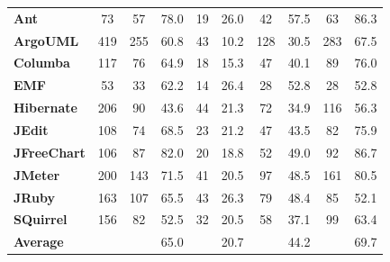 {\begin{table}[!thb]
\begin{center}
\begin{tabular}{l| c c c c c c c c c}
        \textbf{Ant}            & 73  & 57   & 78.0  & 19 & 26.0  & 42  & 57.5 & 63  & 86.3   \\
        \textbf{ArgoUML}        & 419 & 255  & 60.8  & 43 & 10.2  & 128 & 30.5 & 283 & 67.5   \\
        \textbf{Columba}        & 117 & 76   & 64.9  & 18 & 15.3  & 47  & 40.1 & 89  & 76.0   \\
        \textbf{EMF}            & 53  & 33   & 62.2  & 14 & 26.4  & 28  & 52.8 & 28  & 52.8   \\
        \textbf{Hibernate}      & 206 & 90   & 43.6  & 44 & 21.3  & 72  & 34.9 & 116 & 56.3   \\
        \textbf{JEdit}          & 108 & 74   & 68.5  & 23 & 21.2  & 47  & 43.5 & 82  & 75.9   \\
        \textbf{JFreeChart}     & 106 & 87   & 82.0  & 20 & 18.8  & 52  & 49.0 & 92  & 86.7   \\
        \textbf{JMeter}         & 200 & 143  & 71.5  & 41 & 20.5  & 97  & 48.5 & 161 & 80.5   \\
        \textbf{JRuby}          & 163 & 107  & 65.5  & 43 & 26.3  & 79  & 48.4 & 85  & 52.1   \\
        \textbf{SQuirrel}       & 156 & 82   & 52.5  & 32 & 20.5  & 58  & 37.1 & 99  & 63.4   \\
        \midrule
        \textbf{Average}        &     &      & 65.0  &    & 20.7  &     & 44.2 &     & 69.7  \\

        \bottomrule
        \end{tabular}
    \end{center}
\end{table} 

}
